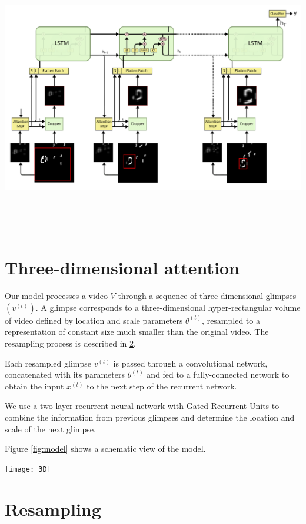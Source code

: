 \documentclass{article} %
\begin{document}
\includegraphics[width=17cm, height=12cm]{LSTM_2D_Attention_v2.png}
\section{Three-dimensional attention}

Our model processes a video $V$ through a sequence of three-dimensional glimpses $\left(v^{(t)}\right)$.
A glimpse corresponds to a three-dimensional hyper-rectangular volume of video defined by location and scale parameters $\theta^{(t)}$, resampled to a representation of constant size much smaller than the original video.
The resampling process is described in \ref{sec:resampling}.

Each resampled glimpse $v^{(t)}$ is passed through a convolutional network, concatenated with its parameters $\theta^{(t)}$ and fed to a fully-connected network to obtain the input $x^{(t)}$ to the next step of the recurrent network.

We use a two-layer recurrent neural network with Gated Recurrent Units\cite{Cho2014} to combine the information from previous glimpses and determine the location and scale of the next glimpse.

Figure \ref{fig:model} shows a schematic view of the model.

\texttt{[image: 3D]}




\section{Resampling}
\label{sec:resampling}
\end{document}
